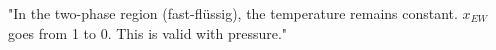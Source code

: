 "In the two-phase region (fast-flüssig), the temperature remains constant. \( x_{EW} \) goes from 1 to 0. This is valid with pressure."